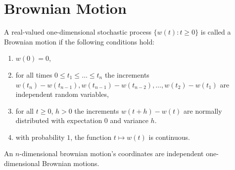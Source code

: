 \section{Brownian Motion}
\begin{definition}\label{def:brownianMotion}
	A real-valued one-dimensional stochastic process $\{w(t) : t\geq 0\}$ is called a Brownian motion if the following conditions hold:
	\begin{enumerate}
		\item $w(0) = 0$,
		\item for all times $0\leq t_1 \leq \dots \leq t_n$ the increments $w(t_n)-w(t_{n-1}),w(t_{n-1})-w(t_{n-2}),\dots,w(t_2)-w(t_{1})$ are independent random variables,
		\item for all $t \geq 0$, $h>0$ the increments $w(t+h)-w(t)$ are normally distributed with expectation $0$ and variance $h$.
		\item with probability $1$, the function $t\mapsto w(t)$ is continuous.
	\end{enumerate}
	
	An $n$-dimensional brownian motion's coordinates are independent one-dimensional Brownian motions.
\end{definition}















